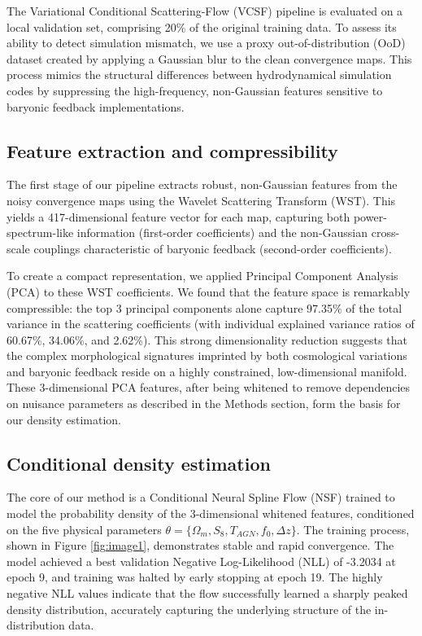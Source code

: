 \documentclass[]{article}
\begin{document}
The Variational Conditional Scattering-Flow (VCSF) pipeline is evaluated on a local validation set, comprising 20\% of the original training data. To assess its ability to detect simulation mismatch, we use a proxy out-of-distribution (OoD) dataset created by applying a Gaussian blur to the clean convergence maps. This process mimics the structural differences between hydrodynamical simulation codes by suppressing the high-frequency, non-Gaussian features sensitive to baryonic feedback implementations.

\subsection{Feature extraction and compressibility}
The first stage of our pipeline extracts robust, non-Gaussian features from the noisy convergence maps using the Wavelet Scattering Transform (WST). This yields a 417-dimensional feature vector for each map, capturing both power-spectrum-like information (first-order coefficients) and the non-Gaussian cross-scale couplings characteristic of baryonic feedback (second-order coefficients).

To create a compact representation, we applied Principal Component Analysis (PCA) to these WST coefficients. We found that the feature space is remarkably compressible: the top 3 principal components alone capture 97.35\% of the total variance in the scattering coefficients (with individual explained variance ratios of 60.67\%, 34.06\%, and 2.62\%). This strong dimensionality reduction suggests that the complex morphological signatures imprinted by both cosmological variations and baryonic feedback reside on a highly constrained, low-dimensional manifold. These 3-dimensional PCA features, after being whitened to remove dependencies on nuisance parameters as described in the Methods section, form the basis for our density estimation.

\subsection{Conditional density estimation}
The core of our method is a Conditional Neural Spline Flow (NSF) trained to model the probability density of the 3-dimensional whitened features, conditioned on the five physical parameters $\theta = \{\Omega_m, S_8, T_{AGN}, f_0, \Delta z\}$. The training process, shown in Figure \ref{fig:image1}, demonstrates stable and rapid convergence. The model achieved a best validation Negative Log-Likelihood (NLL) of -3.2034 at epoch 9, and training was halted by early stopping at epoch 19. The highly negative NLL values indicate that the flow successfully learned a sharply peaked density distribution, accurately capturing the underlying structure of the in-distribution data.
\end{document}
